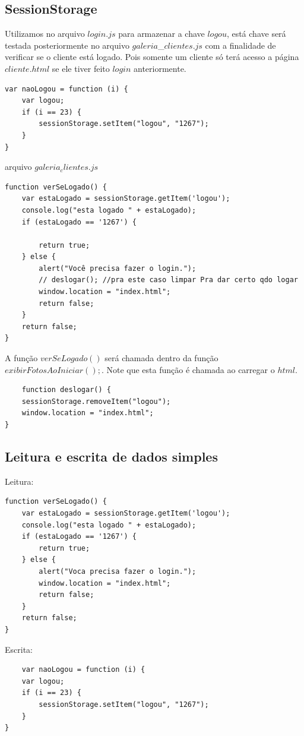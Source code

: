 \subsection{SessionStorage}

	Utilizamos no arquivo $login.js$ para armazenar a chave $logou$, está chave será testada posteriormente no arquivo $galeria$\_$clientes.js$ com a finalidade de verificar se o cliente está logado. Pois somente um cliente só terá acesso a página $cliente.html$ se ele tiver feito $login$ anteriormente. 
	
\begin{lstlisting}
var naoLogou = function (i) {
    var logou;
    if (i == 23) {
        sessionStorage.setItem("logou", "1267");
    }
}
\end{lstlisting}

arquivo $galeria_clientes.js$

\begin{lstlisting}
function verSeLogado() {
    var estaLogado = sessionStorage.getItem('logou');
    console.log("esta logado " + estaLogado);
    if (estaLogado == '1267') {

        return true;
    } else {
        alert("Você precisa fazer o login.");
        // deslogar(); //pra este caso limpar Pra dar certo qdo logar 
        window.location = "index.html";
        return false;
    }
    return false;
}
\end{lstlisting}

	A função $verSeLogado()$ será chamada dentro da função $exibirFotosAoIniciar();$.
	Note que esta função é chamada ao carregar o $html$.
	
\begin{lstlisting}
	function deslogar() {
    sessionStorage.removeItem("logou");
    window.location = "index.html";
}
\end{lstlisting}
\subsection{Leitura e escrita de dados simples}
	Leitura:
\begin{lstlisting}	
function verSeLogado() {
    var estaLogado = sessionStorage.getItem('logou');
    console.log("esta logado " + estaLogado);
    if (estaLogado == '1267') {
        return true;
    } else {
        alert("Voca precisa fazer o login.");
        window.location = "index.html";
        return false;
    }
    return false;
}
\end{lstlisting}
	Escrita:
\begin{lstlisting}	
	var naoLogou = function (i) {
    var logou;
    if (i == 23) {
        sessionStorage.setItem("logou", "1267");
    }
}
\end{lstlisting}
